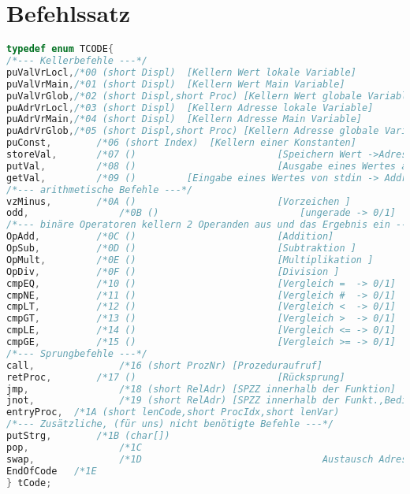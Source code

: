 \section{Befehlssatz}
\begin{footnotesize}
\begin{lstlisting}[language=C]
typedef enum TCODE{
/*--- Kellerbefehle ---*/
puValVrLocl,/*00 (short Displ)	[Kellern Wert lokale Variable]								*/
puValVrMain,/*01 (short Displ)	[Kellern Wert Main Variable]									*/
puValVrGlob,/*02 (short Displ,short Proc) [Kellern Wert globale Variable]			*/
puAdrVrLocl,/*03 (short Displ)	[Kellern Adresse lokale Variable]							*/
puAdrVrMain,/*04 (short Displ)	[Kellern Adresse Main Variable] 							*/
puAdrVrGlob,/*05 (short Displ,short Proc) [Kellern Adresse globale Variable]	*/
puConst,		/*06 (short Index)	[Kellern einer Konstanten]										*/
storeVal,		/*07 ()							[Speichern Wert ->Adresse, beides aus Keller]	*/
putVal,			/*08 ()							[Ausgabe eines Wertes aus Keller nach stdout]	*/
getVal,			/*09 () 		[Eingabe eines Wertes von stdin -> Addr. im Keller ]	*/
/*--- arithmetische Befehle ---*/
vzMinus,		/*0A ()						 	[Vorzeichen ]																	*/
odd,				/*0B ()						 	[ungerade -> 0/1]																*/
/*--- binäre Operatoren kellern 2 Operanden aus und das Ergebnis ein ---*/
OpAdd,			/*0C ()						 	[Addition] 																		*/
OpSub,			/*0D ()						 	[Subtraktion ] 																*/
OpMult,			/*0E ()						 	[Multiplikation ] 														*/
OpDiv,			/*0F ()						 	[Division ] 																	*/
cmpEQ,			/*10 ()						 	[Vergleich =  -> 0/1] 												*/
cmpNE,			/*11 ()						 	[Vergleich #  -> 0/1] 												*/
cmpLT,			/*12 ()						 	[Vergleich <  -> 0/1] 												*/
cmpGT,			/*13 ()						 	[Vergleich >  -> 0/1] 												*/
cmpLE,			/*14 ()						 	[Vergleich <= -> 0/1]													*/
cmpGE,			/*15 ()						 	[Vergleich >= -> 0/1] 												*/
/*--- Sprungbefehle ---*/
call,				/*16 (short ProzNr) [Prozeduraufruf]															*/
retProc,		/*17 ()							[Rücksprung]																	*/
jmp,				/*18 (short RelAdr) [SPZZ innerhalb der Funktion]									*/
jnot,				/*19 (short RelAdr) [SPZZ innerhalb der Funkt.,Beding.aus Keller]	*/
entryProc,	/*1A (short lenCode,short ProcIdx,short lenVar)										*/
/*--- Zusätzliche, (für uns) nicht benötigte Befehle ---*/
putStrg,		/*1B (char[]) 																										*/
pop,				/*1C																															*/
swap,				/*1D								Austausch Adresse gegen Wert									*/
EndOfCode 	/*1E 																															*/
} tCode;
\end{lstlisting}
\end{footnotesize}
